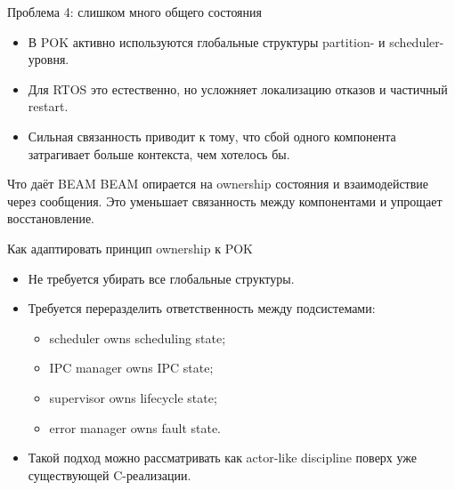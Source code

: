 \documentclass[aspectratio=169]{beamer}
\begin{document}
	\begin{frame}{Проблема 4: слишком много общего состояния}
		\begin{itemize}
			\item В POK активно используются глобальные структуры partition- и scheduler-уровня.
			\item Для RTOS это естественно, но усложняет локализацию отказов и частичный restart.
			\item Сильная связанность приводит к тому, что сбой одного компонента затрагивает больше контекста, чем хотелось бы.
		\end{itemize}
		
		\vspace{0.3cm}
		
		\begin{block}{Что даёт BEAM}
			BEAM опирается на ownership состояния и взаимодействие через сообщения.
			Это уменьшает связанность между компонентами и упрощает восстановление.
		\end{block}
	\end{frame}
	
	\begin{frame}{Как адаптировать принцип ownership к POK}
		\begin{itemize}
			\item Не требуется убирать все глобальные структуры.
			\item Требуется переразделить ответственность между подсистемами:
			\begin{itemize}
				\item scheduler owns scheduling state;
				\item IPC manager owns IPC state;
				\item supervisor owns lifecycle state;
				\item error manager owns fault state.
			\end{itemize}
			\item Такой подход можно рассматривать как actor-like discipline поверх уже существующей C-реализации.
		\end{itemize}
	\end{frame}
	
\end{document}
